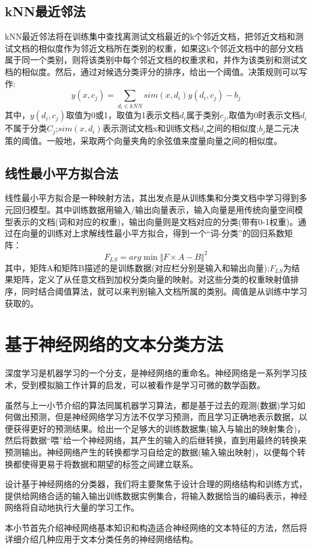 \documentclass[UTF8]{ctexart}
\begin{document}
\subsection{kNN最近邻法}
	kNN最近邻法将在训练集中查找离测试文档最近的k个邻近文档，把邻近文档和测试文档的相似度作为邻近文档所在类别的权重，如果这k个邻近文档中的部分文档属于同一个类别，则将该类别中每个邻近文档的权重求和，并作为该类别和测试文档的相似度。然后，通过对候选分类评分的排序，给出一个阈值。决策规则可以写作:
	\begin{displaymath}
		y(x,c_j)=\sum_{d_i\in kNN}sim(x,d_i)y(d_i,c_j)-b_j
	\end{displaymath}
	其中，$y(d_i,c_j)$取值为0或1，取值为1表示文档$d_i$属于类别$c_j$,取值为0时表示文档$d_i$不属于分类$C_j$;$sim(x,d_i)$表示测试文档x和训练文档$d_i$之间的相似度;$b_j$是二元决策的阈值。一般地，采取两个向量夹角的余弦值来度量向量之间的相似度。

\subsection{线性最小平方拟合法}
	线性最小平方拟合是一种映射方法，其出发点是从训练集和分类文档中学习得到多元回归模型。其中训练数据用输入/输出向量表示，输入向量是用传统向量空间模型表示的文档(词和对应的权重)，输出向量则是文档对应的分类(带有0-1权重)。通过在向量的训练对上求解线性最小平方拟合，得到一个“词-分类”的回归系数矩阵：
	\begin{displaymath}
		F_{LS}=arg\min {\Vert F \times A - B \Vert}^2
	\end{displaymath}
	其中，矩阵A和矩阵B描述的是训练数据(对应栏分别是输入和输出向量);$F_{LS}$为结果矩阵，定义了从任意文档到加权分类向量的映射。对这些分类的权重映射值排序，同时结合阈值算法，就可以来判别输入文档所属的类别。阈值是从训练中学习获取的。

\section{基于神经网络的文本分类方法}
	深度学习是机器学习的一个分支，是神经网络的重命名。神经网络是一系列学习技术，受到模拟脑工作计算的启发，可以被看作是学习可微的数学函数。
	\par 虽然与上一小节介绍的算法同属机器学习算法，都是基于过去的观测(数据)学习如何做出预测，但是神经网络学习方法不仅学习预测，而且学习正确地表示数据，以便获得更好的预测结果。给出一个足够大的训练数据集(输入与输出的映射集合)，然后将数据“喂”给一个神经网络，其产生的输入的后继转换，直到用最终的转换来预测输出。神经网络产生的转换都学习自给定的数据(输入输出映射)，以便每个转换都使得更易于将数据和期望的标签之间建立联系。
	\par 设计基于神经网络的分类器，我们将主要聚焦于设计合理的网络结构和训练方式，提供给网络合适的输入输出训练数据实例集合，将输入数据恰当的编码表示，神经网络将自动地执行大量的学习工作。
	\par 本小节首先介绍神经网络基本知识和构造适合神经网络的文本特征的方法，然后将详细介绍几种应用于文本分类任务的神经网络结构。
\end{document}
